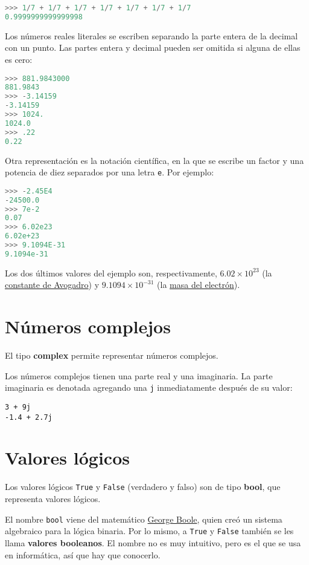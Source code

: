 \begin{lstlisting}[language=py]
>>> 1/7 + 1/7 + 1/7 + 1/7 + 1/7 + 1/7 + 1/7
0.9999999999999998
\end{lstlisting}

Los números reales literales se escriben separando la parte entera de la
decimal con un punto. Las partes entera y decimal pueden ser omitida si
alguna de ellas es cero:

\begin{lstlisting}[language=py]
>>> 881.9843000
881.9843
>>> -3.14159
-3.14159
>>> 1024.
1024.0
>>> .22
0.22
\end{lstlisting}

Otra representación es la notación científica, en la que se escribe un
factor y una potencia de diez separados por una letra \lstinline!e!. Por
ejemplo:

\begin{lstlisting}[language=py]
>>> -2.45E4
-24500.0
>>> 7e-2
0.07
>>> 6.02e23
6.02e+23
>>> 9.1094E-31
9.1094e-31
\end{lstlisting}

Los dos últimos valores del ejemplo son, respectivamente,
$6.02\times 10^{23}$ (la
\href{http://es.wikipedia.org/wiki/Constante\_de\_Avogadro}{constante de
Avogadro}) y $9.1094\times 10^{-31}$ (la
\href{http://es.wikipedia.org/wiki/Electr\%C3\%B3n\#Propiedades}{masa
del electrón}).

\section{Números complejos}

El tipo \textbf{complex} permite representar números complejos.

Los números complejos tienen una parte real y una imaginaria. La parte
imaginaria es denotada agregando una \lstinline!j! inmediatamente
después de su valor:

\begin{lstlisting}
3 + 9j
-1.4 + 2.7j
\end{lstlisting}

\section{Valores lógicos}

Los valores lógicos \lstinline!True! y \lstinline!False! (verdadero y
falso) son de tipo \textbf{bool}, que representa valores lógicos.

El nombre \lstinline!bool! viene del matemático
\href{http://es.wikipedia.org/wiki/George\_Boole}{George Boole}, quien
creó un sistema algebraico para la lógica binaria. Por lo mismo, a
\lstinline!True! y \lstinline!False! también se les llama
\textbf{valores booleanos}. El nombre no es muy intuitivo, pero es el
que se usa en informática, así que hay que conocerlo.


